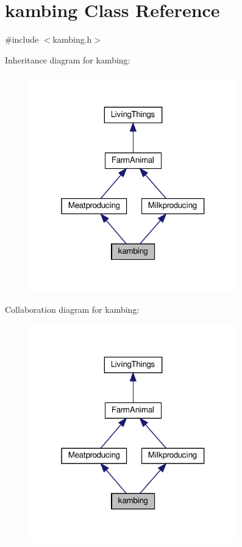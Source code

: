 \hypertarget{classkambing}{}\section{kambing Class Reference}
\label{classkambing}


{\ttfamily \#include $<$kambing.\+h$>$}



Inheritance diagram for kambing\+:
\nopagebreak
\begin{figure}[H]
\begin{center}
\leavevmode
\includegraphics[width=256pt]{classkambing__inherit__graph}
\end{center}
\end{figure}


Collaboration diagram for kambing\+:
\nopagebreak
\begin{figure}[H]
\begin{center}
\leavevmode
\includegraphics[width=256pt]{classkambing__coll__graph}
\end{center}
\end{figure}
